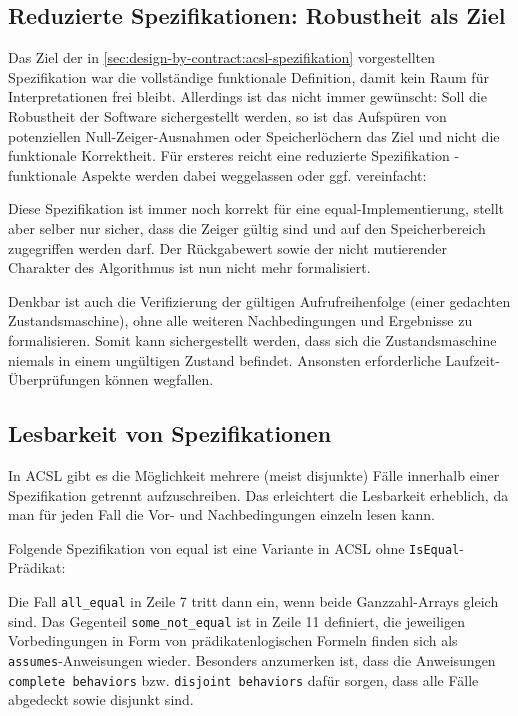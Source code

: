 \subsection{Reduzierte Spezifikationen: Robustheit als Ziel}
\label{sec:design-by-contract:partielle-korrektheit}

Das Ziel der in \ref{sec:design-by-contract:acsl-spezifikation} vorgestellten Spezifikation war die
vollständige funktionale Definition, damit kein Raum für Interpretationen frei bleibt. Allerdings ist
das nicht immer gewünscht: Soll die Robustheit der Software sichergestellt werden, so ist das Aufspüren 
von potenziellen Null-Zeiger-Ausnahmen oder Speicherlöchern das Ziel und nicht die funktionale
Korrektheit. Für ersteres reicht eine reduzierte Spezifikation - funktionale Aspekte werden dabei 
weggelassen oder ggf. vereinfacht:


 
Diese Spezifikation ist immer noch korrekt für eine equal-Implementierung, stellt aber selber nur sicher,
dass die Zeiger gültig sind und auf den Speicherbereich zugegriffen werden darf. Der Rückgabewert sowie 
der nicht mutierender Charakter des Algorithmus ist nun nicht mehr formalisiert.

Denkbar ist auch die Verifizierung der gültigen Aufrufreihenfolge (einer gedachten Zustandsmaschine),
ohne alle weiteren Nachbedingungen und Ergebnisse zu formalisieren. Somit kann sichergestellt werden,
dass sich die Zustandsmaschine niemals in einem ungültigen Zustand befindet. Ansonsten erforderliche
Laufzeit-Überprüfungen können wegfallen.



\subsection{Lesbarkeit von Spezifikationen}
\label{sec:design-by-contract:behaviors}

In ACSL gibt es die Möglichkeit mehrere (meist disjunkte) Fälle innerhalb einer Spezifikation getrennt
aufzuschreiben. Das erleichtert die Lesbarkeit erheblich, da man für jeden Fall die Vor- und Nachbedingungen
einzeln lesen kann.

Folgende Spezifikation von equal ist eine Variante in ACSL ohne \lstinline{IsEqual}-Prädikat:



Die Fall \lstinline{all_equal} in Zeile 7 tritt dann ein, wenn beide Ganzzahl-Arrays gleich sind. Das Gegenteil
\lstinline{some_not_equal} ist in Zeile 11 definiert, die jeweiligen Vorbedingungen in Form von
prädikatenlogischen Formeln finden sich als \lstinline{assumes}-Anweisungen wieder. Besonders anzumerken ist,
dass die Anweisungen \lstinline{complete behaviors} bzw. \lstinline{disjoint behaviors} dafür sorgen, dass
alle Fälle abgedeckt sowie disjunkt sind.

